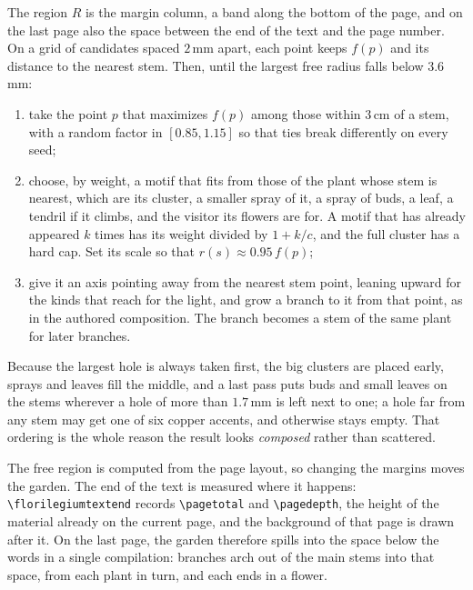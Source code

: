 \begin{construction}[Growth]
The region $R$ is the margin column, a band along the bottom of the page, and on the last
page also the space between the end of the text and the page number. On a grid of candidates
spaced $2\,$mm apart, each point keeps $f(p)$ and its distance to the nearest stem. Then,
until the largest free radius falls below $3.6\,$mm:
\begin{enumerate}
  \item take the point $p$ that maximizes $f(p)$ among those within $3\,$cm of a stem, with
        a random factor in $[0.85,1.15]$ so that ties break differently on every seed;
  \item choose, by weight, a motif that fits from those of the plant whose stem is nearest,
        which are its cluster, a smaller spray of it, a spray of buds, a leaf, a tendril if it
        climbs, and the visitor its flowers are for. A motif that has already appeared $k$ times has its
        weight divided by $1+k/c$, and the full cluster has a hard cap. Set its scale so that
        $r(s)\approx0.95\,f(p)$;
  \item give it an axis pointing away from the nearest stem point, leaning upward for the
        kinds that reach for the light, and grow a branch to it from that point, as in the
        authored composition. The branch becomes a stem of the same plant for later branches.
\end{enumerate}
Because the largest hole is always taken first, the big clusters are placed early, sprays and
leaves fill the middle, and a last pass puts buds and small leaves on the stems wherever a hole
of more than $1.7\,$mm is left next to one; a hole far from any stem may get one of six copper
accents, and otherwise stays empty. That ordering is the whole reason the result looks
\emph{composed} rather than scattered.
\end{construction}

\begin{remark}
The free region is computed from the page layout, so changing the margins moves the
garden. The end of the text is measured where it happens: \verb|\florilegiumtextend|
records \verb|\pagetotal| and \verb|\pagedepth|, the height of the material already on the
current page, and the background of that page is drawn after it. On the last page, the
garden therefore spills into the space below the words in a single compilation: branches
arch out of the main stems into that space, from each plant in turn, and each ends in a
flower.
\end{remark}


